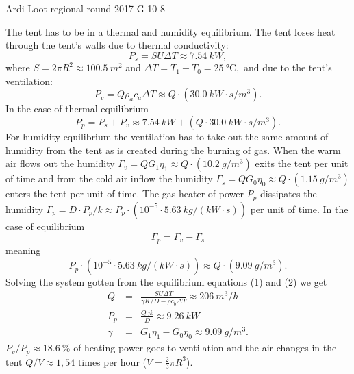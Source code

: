 \documentclass[11pt]{article}
\begin{document}
{Ardi Loot} %
{regional round} %
{2017} %
{G 10} %
{8} %
{

\ifEngSolution
The tent has to be in a thermal and humidity equilibrium. The tent loses heat through the tent’s walls due to thermal conductivity:
\[
P_{s}=SU\Delta T\approx\SI{7.54}{kW},
\]
where $S=2\pi R^{2}\approx\SI{100.5}{m^{2}}$ and $\Delta T=T_{1}-T_{0}=\SI{25}{\celsius},$ and due to the tent’s ventilation:
\[
P_{v}=Q\rho_{a}c_{a}\Delta T\approx Q\cdot\left(\SI{30.0}{kW\cdot s/m^{3}}\right).
\]
In the case of thermal equilibrium
\begin{equation}
P_{p}=P_{s}+P_{v}\approx\SI{7.54}{kW}+\left(Q\cdot\SI{30.0}{kW\cdot s/m^{3}}\right).\label{eq:2017-v2g-10-gaas-eq1}
\end{equation}
For humidity equilibrium the ventilation has to take out the same amount of humidity from the tent as is created during the burning of gas. When the warm air flows out the humidity $\Gamma_{v}=QG_{1}\eta_{1}\approx Q\cdot\left(\SI{10.2}{g/m^{3}}\right)$ exits the tent per unit of time and from the cold air inflow the humidity $\Gamma_{s}=QG_{0}\eta_{0}\approx Q\cdot\left(\SI{1.15}{g/m^{3}}\right)$ enters the tent per unit of time. The gas heater of power $P_{p}$ dissipates the humidity $\Gamma_{p}=D\cdot P_{p}/k\approx P_{p}\cdot\left(10^{-5}\cdot\SI{5.63}{kg/\left(kW\cdot s\right)}\right)$ per unit of time. In the case of equilibrium
\[
\Gamma_{p}=\Gamma_{v}-\Gamma_{s}
\]
meaning 
\begin{equation}
P_{p}\cdot\left(10^{-5}\cdot\SI{5.63}{kg/\left(kW\cdot s\right)}\right)\approx Q\cdot\left(\SI{9.09}{g/m^{3}}\right).\label{eq:2017-v2g-10-gaas-eq2}
\end{equation}
Solving the system gotten from the equilibrium equations (1) and (2) we get
\begin{eqnarray*}
	Q & = & \frac{SU\Delta T}{\gamma K/D-\rho c_{\tilde{o}}\Delta T}\approx\SI{206}{m^{3}/h}\\
	P_{p} & = & \frac{Q\gamma k}{D}\approx\SI{9.26}{kW}\\
	\gamma & = & G_{1}\eta_{1}-G_{0}\eta_{0}\approx\SI{9.09}{g/m^{3}}.
\end{eqnarray*}
$P_{v}/P_{p}\approx\SI{18.6}{\percent}$ of heating power goes to ventilation and the air changes in the tent $Q/V\approx1,54$ times per hour ($V=\frac{2}{3}\pi R^{3}$).
\fi
}
\end{document}
